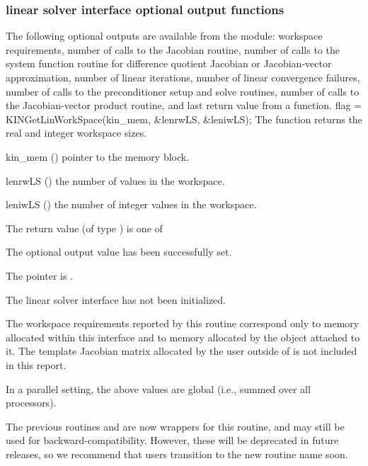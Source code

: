 
\subsubsection{{\kinls} linear solver interface optional output functions}
\label{sss:optout_ls}

The following optional outputs are available from the {\kinls} module:
workspace requirements,
number of calls to the Jacobian routine,
number of calls to the system function routine for difference quotient Jacobian or Jacobian-vector approximation,
number of linear iterations,
number of linear convergence failures,
number of calls to the preconditioner setup and solve routines,
number of calls to the Jacobian-vector product routine,
and last return value from a {\kinls} function.
{
  flag = KINGetLinWorkSpace(kin\_mem, \&lenrwLS, \&leniwLS);
}
{
  The function  returns the
  {\kinls} real and integer workspace sizes.
}
{
  \begin{args}
  \item[kin\_mem] ()
    pointer to the {\kinsol} memory block.
  \item[lenrwLS] ()
    the number of  values in the {\kinls} workspace.
  \item[leniwLS] ()
    the number of integer values in the {\kinls} workspace.
  \end{args}
}
{
  The return value  (of type ) is one of
  \begin{args}
  \item[\Id{KINLS\_SUCCESS}]
    The optional output value has been successfully set.
  \item[\Id{KINLS\_MEM\_NULL}]
    The  pointer is .
  \item[\Id{KINLS\_LMEM\_NULL}]
    The {\kinls} linear solver interface has not been initialized.
  \end{args}
}
{
  The workspace requirements reported by this routine correspond only
  to memory allocated within this interface and to memory allocated by
  the {\sunlinsol} object attached to it.  The template Jacobian
  matrix allocated by the user outside of {\kinls} is not included in
  this report.

  In a parallel setting, the above values are global (i.e., summed over all
  processors).

  The previous routines  and
   are now wrappers for this routine, and may
  still be used for backward-compatibility.  However, these will be
  deprecated in future releases, so we recommend that users transition
  to the new routine name soon.
}
